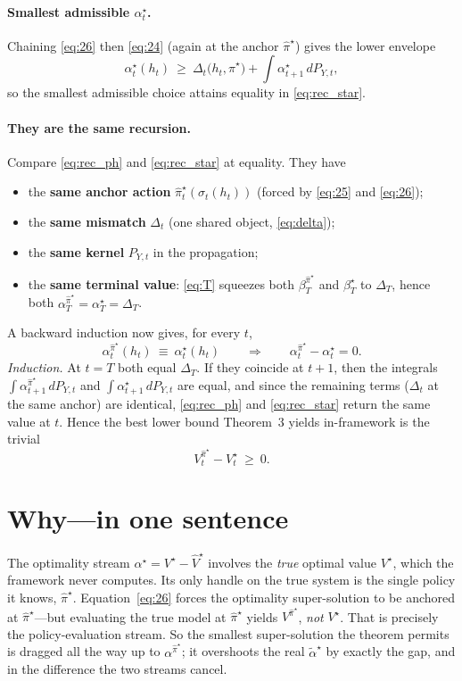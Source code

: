 \documentclass[11pt]{article}
\newcommand{\Vhat}{\hat V}
\newcommand{\pihat}{\hat\pi}
\newcommand{\PY}{P_{Y,t}}
\theoremstyle{definition}
\begin{document}
\paragraph{Smallest admissible $\alpha^{\star}_t$.} Chaining \eqref{eq:26} then
\eqref{eq:24} (again at the anchor $\pihat^\star$) gives the lower envelope
\begin{equation}
\alpha^{\star}_t(h_t)\ \ge\ \Delta_t\bigl(h_t,\pihat^\star\bigr)+\int \alpha^{\star}_{t+1}\,d\PY,
\label{eq:rec_star}
\end{equation}
so the smallest admissible choice attains equality in \eqref{eq:rec_star}.

\paragraph{They are the same recursion.} Compare \eqref{eq:rec_ph} and
\eqref{eq:rec_star} at equality. They have
\begin{itemize}
\item the \textbf{same anchor action} $\pihat^\star_t(\sigma_t(h_t))$ (forced by
\eqref{eq:25} and \eqref{eq:26});
\item the \textbf{same mismatch} $\Delta_t$ (one shared object, \eqref{eq:delta});
\item the \textbf{same kernel} $\PY$ in the propagation;
\item the \textbf{same terminal value}: \eqref{eq:T} squeezes both
$\beta^{\pihat^\star}_T$ and $\beta^\star_T$ to $\Delta_T$, hence both
$\alpha^{\pihat^\star}_T=\alpha^\star_T=\Delta_T$.
\end{itemize}
A backward induction now gives, for every $t$,
\begin{equation}
\alpha^{\pihat^\star}_t(h_t)\ \equiv\ \alpha^{\star}_t(h_t)
\qquad\Longrightarrow\qquad
\alpha^{\pihat^\star}_t-\alpha^{\star}_t = 0 .
\end{equation}
\emph{Induction.} At $t=T$ both equal $\Delta_T$. If they coincide at $t+1$, then
the integrals $\int\alpha^{\pihat^\star}_{t+1}\,d\PY$ and
$\int\alpha^{\star}_{t+1}\,d\PY$ are equal, and since the remaining terms
($\Delta_t$ at the same anchor) are identical, \eqref{eq:rec_ph} and
\eqref{eq:rec_star} return the same value at $t$. Hence the best lower bound
Theorem~3 yields in-framework is the trivial
\[
V^{\pihat^\star}_t-V^\star_t\ \ge\ 0 .
\]

\section{Why---in one sentence}
The optimality stream $\alpha^\star=V^\star-\Vhat^\star$ involves the \emph{true}
optimal value $V^\star$, which the framework never computes. Its only handle on the
true system is the single policy it knows, $\pihat^\star$. Equation~\eqref{eq:26}
forces the optimality super-solution to be anchored at $\pihat^\star$---but
evaluating the true model at $\pihat^\star$ yields $V^{\pihat^\star}$, \emph{not}
$V^\star$. That is precisely the policy-evaluation stream. So the smallest
super-solution the theorem permits is dragged all the way up to
$\alpha^{\pihat^\star}$; it overshoots the real $\tilde\alpha^\star$ by exactly the
gap, and in the difference the two streams cancel.
\end{document}
